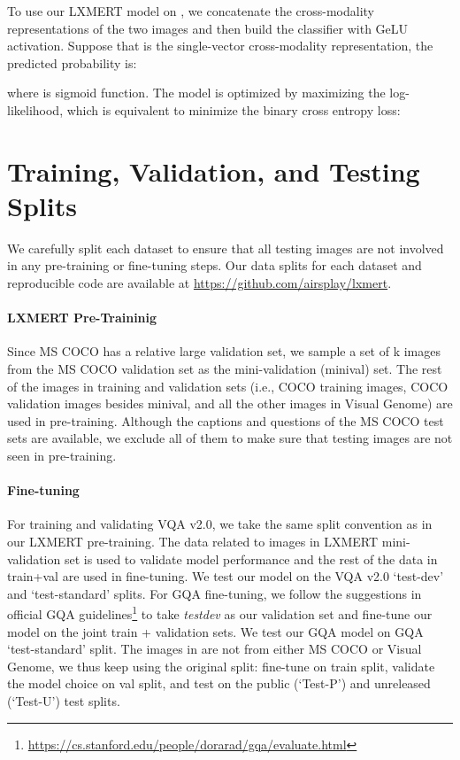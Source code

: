 \documentclass[11pt,a4paper]{article}
\begin{document}
To use our LXMERT model on , we concatenate the cross-modality representations of the two images and then build the classifier with GeLU activation\cite{hendrycks2016bridging}.
Suppose that  is the single-vector cross-modality representation, the predicted probability is:

where  is sigmoid function.
The model is optimized by maximizing the log-likelihood, which is equivalent to minimize the binary cross entropy loss:




\section{Training, Validation, and Testing Splits}
We carefully split each dataset to ensure that all testing images are not involved in any pre-training or fine-tuning steps.
Our data splits for each dataset and reproducible code are available at \href{https://github.com/airsplay/lxmert}{https://github.com/airsplay/lxmert}.
\paragraph{LXMERT Pre-Traininig}
Since MS COCO has a relative large validation set, 
we sample a set of k images from the MS COCO validation set as the mini-validation (minival) set.
The rest of the images in training and validation sets (i.e., COCO training images, COCO validation images besides minival, and all the other images in Visual Genome) are used in pre-training.
Although the captions and questions of the MS COCO test sets are available, we exclude all of them to make sure that testing images are not seen in pre-training.
\paragraph{Fine-tuning}
For training and validating VQA v2.0, we take the same split convention as in our LXMERT pre-training.
The data related to images in LXMERT mini-validation set is used to validate model performance and the rest of the data in train+val are used in fine-tuning.
We test our model on the VQA v2.0 `test-dev' and `test-standard' splits.
For GQA fine-tuning, we follow the suggestions in official GQA guidelines\footnote{
\href{https://cs.stanford.edu/people/dorarad/gqa/evaluate.html}{https://cs.stanford.edu/people/dorarad/gqa/evaluate.html}
} to take \emph{testdev} as our validation set and fine-tune our model on the joint train + validation sets.
We test our GQA model on GQA `test-standard' split.
The images in  are not from either MS COCO or Visual Genome, we thus keep using the original split: fine-tune on train split, validate the model choice on val split, and test on the public (`Test-P') and unreleased (`Test-U') test splits.
\end{document}
